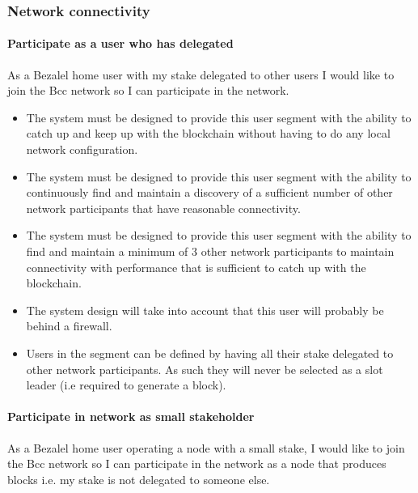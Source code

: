 \subsubsection{Network connectivity}\label{network-connectivity}

\paragraph{Participate as a user who has delegated}

As a Bezalel home user with my stake delegated to other users
I would like to join the Bcc network so I can participate in the network.
\begin{itemize}
\item The system must be designed to provide this user segment with the ability
      to catch up and keep up with the blockchain without having
      to do any local network configuration.
\item The system must be designed to provide this user segment with the ability to
      continuously find and maintain a discovery of a sufficient number of
      other network participants that have reasonable connectivity.
\item The system must be designed to provide this user segment with the ability to
      find and maintain a minimum of 3 other network participants to maintain
      connectivity with performance that is sufficient to catch up with the
      blockchain.
\item The system design will take into account that this user will probably be
      behind a firewall.
\item Users in the segment can be defined by having all their stake
      delegated to other network participants.
      As such they will never be selected as a slot leader (i.e required to generate a block).
\end{itemize}


\paragraph{Participate in network as small stakeholder}

As a Bezalel home user operating a node with a small stake,
I would like to join the Bcc network so I can participate in the network as a
node that produces blocks i.e. my stake is not delegated to someone else.

